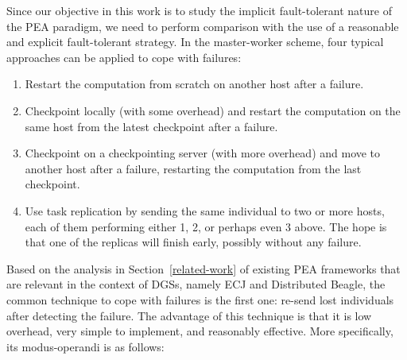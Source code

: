 \documentclass[graybox]{sty/svmult}
\begin{document}
Since our objective in this work is to study the implicit fault-tolerant 
nature of the PEA paradigm, we need to perform comparison with the use
of a reasonable and explicit fault-tolerant strategy.  
In the master-worker scheme, four typical approaches can be applied
to cope with failures:
\begin{enumerate}
    \item Restart the computation from scratch on another host after a failure.
    \item Checkpoint locally (with some overhead) and restart the computation on 
          the same host from the latest checkpoint after a failure.
    \item Checkpoint on a checkpointing server (with more overhead) and move to another host after a failure, restarting the computation
        from the last checkpoint.
    \item Use task replication by sending the same individual to two or more hosts, each of them performing either 1, 2, or perhaps even 3 above. The hope is that one of
         the replicas will finish early, possibly without any failure. 
\end{enumerate}

Based on the analysis in Section~\ref{related-work} of existing PEA
frameworks that are relevant in the context of DGSs, namely ECJ and
Distributed Beagle, the common technique to cope with failures is the
first one: re-send lost individuals after detecting the failure. The
advantage of this technique is that it is low overhead, very simple to
implement, and reasonably effective. More specifically, its modus-operandi
is as follows:
\end{document}
